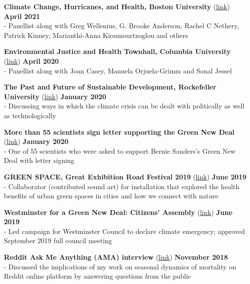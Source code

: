 \noindent \textbf{Climate Change, Hurricanes, and Health, Boston University} (\href{https://bit.ly/2TfExZb}{link}) \hfill \textbf{April 2021}\\
\noindent - Panellist along with Greg Wellenius, G. Brooke Anderson, Rachel C Nethery, Patrick Kinney, Marianthi-Anna Kioumourtzoglou and others \medskip

\noindent \textbf{Environmental Justice and Health Townhall, Columbia University} (\href{https://bit.ly/3bsdZZ3}{link}) \hfill \textbf{April 2020}\\
\noindent - Panellist along with Joan Casey, Manuela Orjuela-Grimm and Sonal Jessel
\medskip

\noindent \textbf{The Past and Future of Sustainable Development, Rockefeller University} (\href{https://bit.ly/2UoPrdD}{link}) \hfill \textbf{January 2020}\\
\noindent - Discussing ways in which the climate crisis can be dealt with politically as well as technologically \medskip

\noindent \textbf{More than 55 scientists sign letter supporting the Green New Deal}  (\href{https://bit.ly/2uiY1Qz}{link}) \hfill \textbf{January 2020}\\
\noindent - One of 55 scientists who were asked to support Bernie Sanders's Green New Deal with letter signing \medskip

\noindent \textbf{GREEN SPACE, Great Exhibition Road Festival 2019} (\href{https://bit.ly/3vMnnk5}{link}) \hfill \textbf{June 2019}\\
\noindent - Collaborator (contributed sound art) for installation that explored the health benefits of urban green spaces in cities and how we connect with nature \medskip

\noindent \textbf{Westminster for a Green New Deal: Citizens' Assembly} 
(\href{https://bit.ly/2HjBxFi}{link}) \hfill \textbf{June 2019}\\
- Led campaign for Westminster Council to declare climate emergency;  approved September 2019 full council meeting \medskip

\noindent \textbf{Reddit Ask Me Anything (AMA) interview} (\href{https://bit.ly/2Qcbu5E}{link}) \hfill \textbf{November 2018}	\\
\noindent - Discussed  the implications of my work on seasonal dynamics of mortality on Reddit online platform by answering questions from the public \medskip

